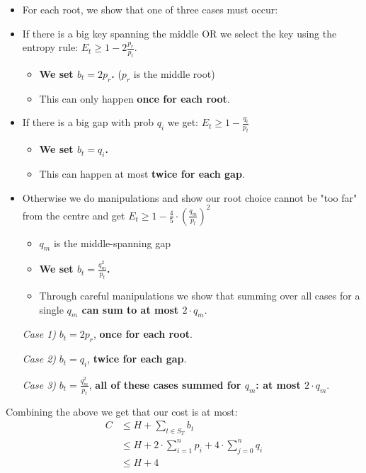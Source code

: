 \documentclass{beamer}
\theoremstyle{plain}
\begin{document}
\begin{frame}

\begin{itemize}
\item<1-> For each root, we show that one of three cases must occur:

\item<2->[\textit{Case 1)}] If there is a big key spanning the middle OR we select the key using the entropy rule: $E_t \geq 1-2 \frac{p_r}{p_t}$. 
\begin{itemize}
\item \textbf{We set $b_t = 2p_r$.} ($p_r$ is the middle root)
\item This can only happen \textbf{once for each root}.
\end{itemize}

\item<3->[\textit{Case 2)}] If there is a big gap with prob $q_i$ we get: $E_t \geq 1-\frac{q_i}{p_t}$ 
\begin{itemize}
\item \textbf{We set $b_t = q_i$.}
\item This can happen at most \textbf{twice for each gap}.
\end{itemize}

\item<4->[\textit{Case 3)}] Otherwise we do manipulations and show our root choice cannot be "too far" from the centre and get $E_t \geq 1 - \frac{4}{5} \cdot \left( \frac{q_m}{p_t}\right)^2$
\begin{itemize}
\item $q_m$ is the middle-spanning gap
\item \textbf{We set $b_t = \frac{q_m^2}{p_t}$.}
\item Through careful manipulations we show that summing over all cases for a single \textbf{$q_m$ can sum to at most $2\cdot q_m$}.
\end{itemize} 
\end{itemize}
\end{frame}

\begin{frame}{}
\begin{itemize}
\item[\textit{Case 1)}] $b_t = 2p_r$, \textbf{once for each root}.

\item[\textit{Case 2)}]$b_t = q_i$, \textbf{twice for each gap}.

\item[\textit{Case 3)}] $b_t = \frac{q_m^2}{p_t}$, \textbf{all of these cases summed for $q_m$: at most $2\cdot q_m$}.
\end{itemize}

Combining the above we get that our cost is at most:
\begin{align*}
C &\leq H + \sum_{t \in S_T} b_t \\
 &\leq H + 2 \cdot \sum_{i=1}^{n} p_i + 4 \cdot \sum_{j=0}^{n} q_i \\
 &\leq H + 4
\end{align*}
\end{frame}
\end{document}
